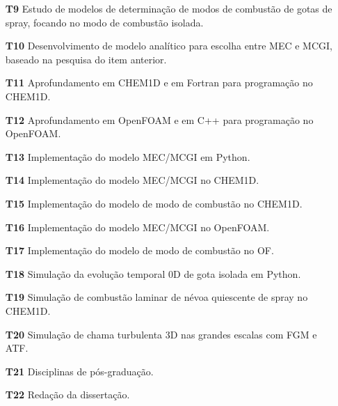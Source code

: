\begin{itemize}
\item[\textbf{T9}] Estudo de modelos de determinação de modos de combustão de gotas de spray, focando no modo de combustão isolada.%
\item[\textbf{T10}] Desenvolvimento de modelo analítico para escolha entre MEC e MCGI, baseado na pesquisa do item anterior.

\item[\textbf{T11}] Aprofundamento em CHEM1D e em Fortran para programação no CHEM1D.
\item[\textbf{T12}] Aprofundamento em OpenFOAM e em C++ para programação no OpenFOAM.

\item[\textbf{T13}] Implementação do modelo MEC/MCGI em Python.%
\item[\textbf{T14}] Implementação do modelo MEC/MCGI no CHEM1D.%
\item[\textbf{T15}] Implementação do modelo de modo de combustão no CHEM1D.
\item[\textbf{T16}] Implementação do modelo MEC/MCGI no OpenFOAM.%
\item[\textbf{T17}] Implementação do modelo de modo de combustão no OF.

\item[\textbf{T18}] Simulação da evolução temporal 0D de gota isolada em Python.           %
\item[\textbf{T19}] Simulação de combustão laminar de névoa quiescente de spray no CHEM1D. %
\item[\textbf{T20}] Simulação de chama turbulenta 3D nas grandes escalas com FGM e ATF.    %

\item[\textbf{T21}] Disciplinas de pós-graduação.%
\item[\textbf{T22}] Redação da dissertação.%
\end{itemize}


